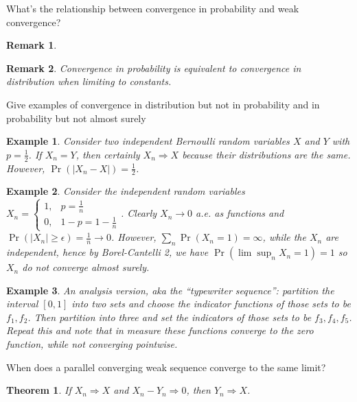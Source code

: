 \documentclass[avery5388,grid,frame]{flashcards}
\newtheorem*{theorem}{Theorem}
\newtheorem*{example}{Example}
\newtheorem*{remark}{Remark}
\begin{document}
\begin{flashcard}
    {What's the relationship between convergence in probability and weak convergence?}
    \begin{remark}

    \end{remark}

    \begin{remark}
        Convergence in probability is equivalent to convergence in distribution when limiting to constants.
    \end{remark}
\end{flashcard}


\begin{flashcard}
    {Give examples of convergence in distribution but not in probability and in probability but not almost surely}
    \begin{example}
        Consider two independent Bernoulli random variables $X$ and $Y$ with $p=\frac 1 2$. If $X_n = Y$, then certainly $X_n \Rightarrow X$ because their distributions are the same. However, $\Pr(|X_n - X|) = \frac 1 2$.
    \end{example}

    \begin{example}
        Consider the independent random variables $X_n =
        \begin{cases}
            1, & p=\frac 1 n\\
            0, & 1-p = 1 - \frac 1 n
        \end{cases}$. Clearly $X_n \rightarrow 0$ a.e. as functions and $\Pr(|X_n| \geq \epsilon) = \frac 1 n \rightarrow 0$. However, $\sum_n \Pr(X_n = 1) = \infty$, while the $X_n$ are independent, hence by Borel-Cantelli 2, we have $\Pr(\lim \sup_n X_n = 1) = 1$ so $X_n$ do not converge almost surely.
    \end{example}

    \begin{example}
        An analysis version, aka the ``typewriter sequence'': partition the interval $[0,1]$ into two sets and choose the indicator functions of those sets to be $f_1, f_2$. Then partition into three and set the indicators of those sets to be $f_3,f_4,f_5$. Repeat this and note that in measure these functions converge to the zero function, while not converging pointwise.
    \end{example}
\end{flashcard}


\begin{flashcard}
    {When does a parallel converging weak sequence converge to the same limit?}
    \begin{theorem}
        If $X_n \Rightarrow X$ and $X_n - Y_n \Rightarrow 0$, then $Y_n \Rightarrow X$.
    \end{theorem}
\end{flashcard}
\end{document}

